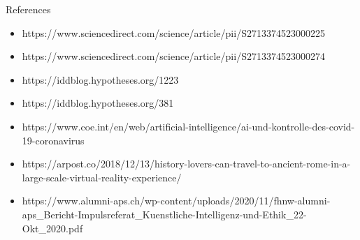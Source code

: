 \documentclass[169,9pt]{beamer}
\begin{document}
\begin{frame}{References}
\begin{itemize}
\item https://www.sciencedirect.com/science/article/pii/S2713374523000225
\item https://www.sciencedirect.com/science/article/pii/S2713374523000274
\item https://iddblog.hypotheses.org/1223
\item https://iddblog.hypotheses.org/381
\item https://www.coe.int/en/web/artificial-intelligence/ai-und-kontrolle-des-covid-
19-coronavirus
\item https://arpost.co/2018/12/13/history-lovers-can-travel-to-ancient-rome-in-a-
large-scale-virtual-reality-experience/
\item https://www.alumni-aps.ch/wp-content/uploads/2020/11/fhnw-alumni-
aps\_Bericht-Impulsreferat\_Kuenstliche-Intelligenz-und-Ethik\_22-
Okt\_2020.pdf
\end{itemize}
\end{frame}

\appendix

\end{document}
